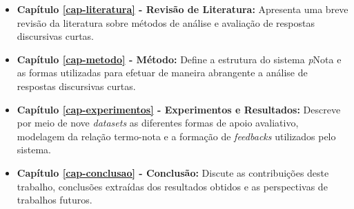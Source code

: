\begin{itemize}
\item \textbf{Capítulo \ref{cap-literatura} - Revisão de Literatura:} Apresenta uma breve revisão da literatura sobre métodos de análise e avaliação de respostas discursivas curtas.

\item \textbf{Capítulo \ref{cap-metodo} - Método:} Define a estrutura do sistema \textit{p}Nota e as formas utilizadas para efetuar de maneira abrangente a análise de respostas discursivas curtas.

\item \textbf{Capítulo \ref{cap-experimentos} - Experimentos e Resultados:} Descreve por meio de nove \textit{datasets} as diferentes formas de apoio avaliativo, modelagem da relação termo-nota e a formação de \textit{feedbacks} utilizados pelo sistema.

\item \textbf{Capítulo \ref{cap-conclusao} - Conclusão:} Discute as contribuições deste trabalho, conclusões extraídas dos resultados obtidos e as perspectivas de trabalhos futuros.

\end{itemize}